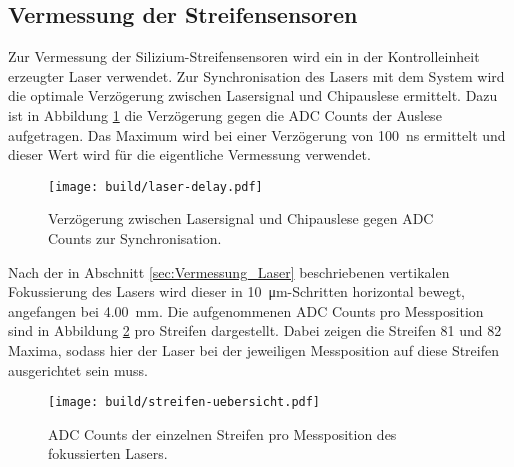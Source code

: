 \FloatBarrier
\subsection{Vermessung der Streifensensoren}
\label{sec:Vermessung-Auswertung}

Zur Vermessung der Silizium-Streifensensoren wird ein in der Kontrolleinheit erzeugter
Laser verwendet. Zur Synchronisation des Lasers mit dem System wird die
optimale Verzögerung zwischen Lasersignal und Chipauslese ermittelt.
Dazu ist in Abbildung \ref{fig:laser-delay} die Verzögerung gegen die ADC Counts
der Auslese aufgetragen.
Das Maximum wird bei einer Verzögerung von \SI{100}{\nano\second} ermittelt und
dieser Wert wird für die eigentliche Vermessung verwendet.
\begin{figure}
  \centering
  \texttt{[image: build/laser-delay.pdf]}  %
  \caption{Verzögerung zwischen Lasersignal und Chipauslese gegen ADC Counts zur
  Synchronisation.}
  \label{fig:laser-delay}
\end{figure}

Nach der in Abschnitt \ref{sec:Vermessung_Laser} beschriebenen vertikalen Fokussierung des
Lasers wird dieser in \SI{10}{\micro\meter}-Schritten horizontal bewegt,
angefangen bei \SI{4.00}{\milli\meter}.
Die aufgenommenen ADC Counts pro Messposition sind in Abbildung \ref{fig:streifen-uebersicht}
pro Streifen dargestellt.
Dabei zeigen die Streifen 81 und 82 Maxima, sodass hier der Laser bei der jeweiligen
Messposition auf diese Streifen ausgerichtet sein muss.
\begin{figure}
  \centering
  \texttt{[image: build/streifen-uebersicht.pdf]}  %
  \caption{ADC Counts der einzelnen Streifen pro Messposition des fokussierten
  Lasers.}
  \label{fig:streifen-uebersicht}
\end{figure}

